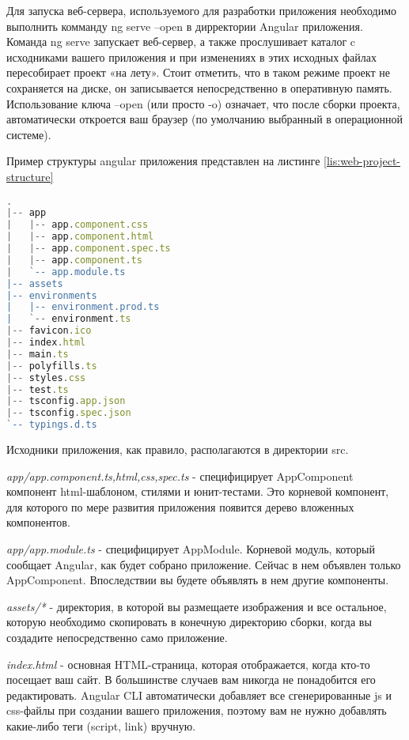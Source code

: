 Для запуска веб-сервера, используемого для разработки приложения необходимо выполнить комманду ng serve –open в дирректории Angular приложения.
Команда ng serve запускает веб-сервер, а также прослушивает каталог c исходниками вашего приложения и при изменениях в этих исходных файлах пересобирает проект «на лету».
Стоит отметить, что в таком режиме проект не сохраняется на диске, он записывается непосредственно в оперативную память.
Использование ключа --open (или просто -o) означает, что после сборки проекта, автоматически откроется ваш браузер (по умолчанию выбранный в операционной системе).

Пример структуры angular приложения представлен на листинге \ref{lis:web-project-structure}

\begin{lstlisting}[language=TypeScript, captionpos=b,
label={lis:web-project-structure},
caption={Пример структуры angular приложения}]
.
|-- app
|   |-- app.component.css
|   |-- app.component.html
|   |-- app.component.spec.ts
|   |-- app.component.ts
|   `-- app.module.ts
|-- assets
|-- environments
|   |-- environment.prod.ts
|   `-- environment.ts
|-- favicon.ico
|-- index.html
|-- main.ts
|-- polyfills.ts
|-- styles.css
|-- test.ts
|-- tsconfig.app.json
|-- tsconfig.spec.json
`-- typings.d.ts
\end{lstlisting}

Исходники приложения, как правило, располагаются в директории src.

\textit{app/app.component.{ts,html,css,spec.ts}} - специфицирует AppComponent компонент html-шаблоном, стилями и юнит-тестами.
Это корневой компонент, для которого по мере развития приложения появится дерево вложенных компонентов.

\textit{app/app.module.ts} - специфицирует AppModule.
Корневой модуль, который сообщает Angular, как будет собрано приложение.
Сейчас в нем объявлен только AppComponent.
Впоследствии вы будете объявлять в нем другие компоненты.

\textit{assets/*} - директория, в которой вы размещаете изображения и все остальное, которую необходимо скопировать в конечную директорию сборки, когда вы создадите непосредственно само приложение.

\textit{index.html} - основная HTML-страница, которая отображается, когда кто-то посещает ваш сайт.
В большинстве случаев вам никогда не понадобится его редактировать.
Angular CLI автоматически добавляет все сгенерированные js и css-файлы при создании вашего приложения, поэтому вам не нужно добавлять какие-либо теги (script, link) вручную.

